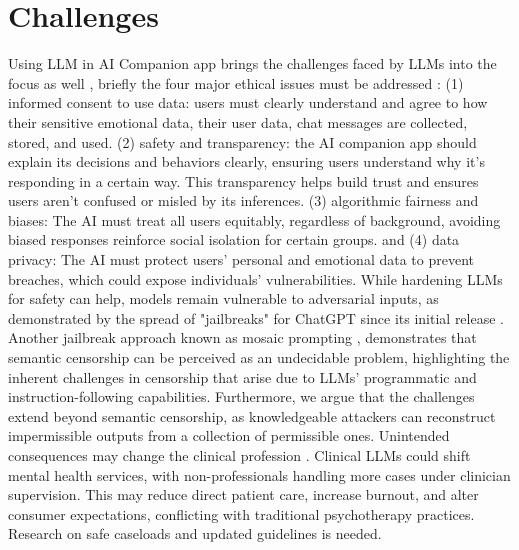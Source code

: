 \section{Challenges}
Using LLM in AI Companion app brings the challenges faced by LLMs into the focus as well \cite{sarker2024llm}, briefly the four major ethical issues must be addressed \cite{gerke2020ethical}: (1) informed consent to use data: users must clearly understand and agree to how their sensitive emotional data, their user data, chat messages are collected, stored, and used. (2) safety and transparency: the AI companion app should explain its decisions and behaviors clearly, ensuring users understand why it's responding in a certain way. This transparency helps build trust and ensures users aren't confused or misled by its inferences. (3) algorithmic fairness and biases: The AI must treat all users equitably, regardless of background, avoiding biased responses reinforce social isolation for certain groups. and (4) data privacy: The AI must protect users' personal and emotional data to prevent breaches, which could expose individuals' vulnerabilities. While hardening LLMs for safety can help, models remain vulnerable to adversarial inputs, as demonstrated by the spread of "jailbreaks" for ChatGPT since its initial release \cite{andriushchenko2024jailbreaking}. Another jailbreak approach known as mosaic prompting \cite{glukhov2023llm}, demonstrates that semantic censorship can be perceived as an undecidable problem, highlighting the inherent challenges in censorship that arise due to LLMs' programmatic and instruction-following capabilities. Furthermore, we argue that the challenges extend beyond semantic censorship, as knowledgeable attackers can reconstruct impermissible outputs from a collection of permissible ones. Unintended consequences may change the clinical profession \cite{stade2024large}. Clinical LLMs could shift mental health services, with non-professionals handling more cases under clinician supervision. This may reduce direct patient care, increase burnout, and alter consumer expectations, conflicting with traditional psychotherapy practices. Research on safe caseloads and updated guidelines is needed.